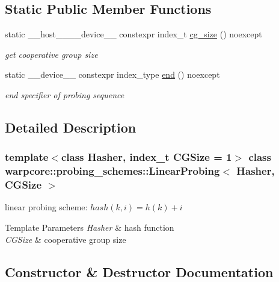 \subsection*{Static Public Member Functions}
\begin{DoxyCompactItemize}
\item 
static \+\_\+\+\_\+host\+\_\+\+\_\+\+\_\+\+\_\+device\+\_\+\+\_\+ constexpr index\+\_\+t \hyperlink{classwarpcore_1_1probing__schemes_1_1LinearProbing_a8490ec06de511d325df3858c5f3eb20c}{cg\+\_\+size} () noexcept
\begin{DoxyCompactList}\small\item\em get cooperative group size \end{DoxyCompactList}\item 
static \+\_\+\+\_\+device\+\_\+\+\_\+ constexpr index\+\_\+type \hyperlink{classwarpcore_1_1probing__schemes_1_1LinearProbing_a3976a90f43e45fcc3438a15417803d88}{end} () noexcept
\begin{DoxyCompactList}\small\item\em end specifier of probing sequence \end{DoxyCompactList}\end{DoxyCompactItemize}


\subsection{Detailed Description}
\subsubsection*{template$<$class Hasher, index\+\_\+t C\+G\+Size = 1$>$\newline
class warpcore\+::probing\+\_\+schemes\+::\+Linear\+Probing$<$ Hasher, C\+G\+Size $>$}

linear probing scheme\+: $hash(k,i) = h(k)+i$ 


\begin{DoxyTemplParams}{Template Parameters}
{\em Hasher} & hash function \\
\hline
{\em C\+G\+Size} & cooperative group size \\
\hline
\end{DoxyTemplParams}


\subsection{Constructor \& Destructor Documentation}
\mbox{\label{classwarpcore_1_1probing__schemes_1_1LinearProbing_affe37a488156f6a5f971e898034fa99d}} 
